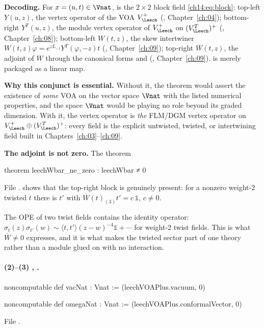 \begin{dictionary}
\textbf{Decoding.}  For $x=(u,t)\in\Vnat$,  is the $2\times2$ block field
\eqref{ch14:eq:block}: top-left $Y(u,z)$, the vertex operator of the VOA $V_\Leech^+$ (,
Chapter~\ref{ch:04}); bottom-right $Y^T(u,z)$, the module vertex operator of $V_\Leech^+$ on
$(V_\Leech^T)^+$ (, Chapter~\ref{ch:08}); bottom-left $W(t,z)$, the skew intertwiner
$W(t,z)\varphi=e^{zL_{-1}}Y^T(\varphi,-z)t$ (, Chapter~\ref{ch:09}); top-right $\overline W(t,z)$, the
adjoint of $W$ through the canonical forms  and  (, Chapter~\ref{ch:09}).
 is merely  packaged as a linear map.

\textbf{Why this conjunct is essential.}  Without it, the theorem would assert the existence of
\emph{some} VOA on the vector space $\Vnat$ with the listed numerical properties, and the space
$\Vnat$ would be playing no role beyond its graded dimension.  With it, the vertex operator is
\emph{the} FLM/DGM vertex operator on $V_\Leech^+\oplus(V_\Leech^T)^+$: every field is the explicit
untwisted, twisted, or intertwining field built in Chapters~\ref{ch:03}--\ref{ch:09}.

\textbf{The adjoint is not zero.}  The theorem
\begin{leancode}
theorem leechWbar_ne_zero : leechWbar ≠ 0
\end{leancode}
File .
shows that the top-right block is genuinely present: for a nonzero weight-2 twisted $t$ there is $t'$ with
$\overline W(t)_{(3)}t'=c\,\mathbb 1$, $c\ne0$.
\end{dictionary}

\begin{physics}
The OPE of two twist fields contains the identity operator: $\sigma_t(z)\sigma_{t'}(w)\sim
\langle t,t'\rangle(z-w)^{-4}\mathbb 1+\cdots$ for weight-2 twist fields.  This is what
$\overline W\neq0$ expresses, and it is what makes the twisted sector part of one theory rather than a module
glued on with no interaction.
\end{physics}

\paragraph{(2)--(3) , .}
\begin{leancode}
noncomputable def vacNat : Vnat := (leechVOAPlus.vacuum, 0)

noncomputable def omegaNat : Vnat := (leechVOAPlus.conformalVector, 0)
\end{leancode}
File .

